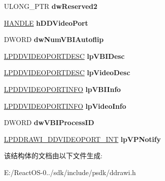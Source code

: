 \begin{DoxyCompactItemize}
U\+L\+O\+N\+G\+\_\+\+P\+TR {\bfseries dw\+Reserved2}
\item 
\mbox{\label{struct___d_d_r_a_w_i___d_d_v_i_d_e_o_p_o_r_t___l_c_l_a5feaf96f97dd06205e008cdae0ab720b}} 
\hyperlink{interfacevoid}{H\+A\+N\+D\+LE} {\bfseries h\+D\+D\+Video\+Port}
\item 
\mbox{\label{struct___d_d_r_a_w_i___d_d_v_i_d_e_o_p_o_r_t___l_c_l_a57682165ddae367279bb06b49b812bce}} 
D\+W\+O\+RD {\bfseries dw\+Num\+V\+B\+I\+Autoflip}
\item 
\mbox{\label{struct___d_d_r_a_w_i___d_d_v_i_d_e_o_p_o_r_t___l_c_l_af19ca9c80f8f821ca6d2ecc637a6d7e0}} 
\hyperlink{struct___d_d_v_i_d_e_o_p_o_r_t_d_e_s_c}{L\+P\+D\+D\+V\+I\+D\+E\+O\+P\+O\+R\+T\+D\+E\+SC} {\bfseries lp\+V\+B\+I\+Desc}
\item 
\mbox{\label{struct___d_d_r_a_w_i___d_d_v_i_d_e_o_p_o_r_t___l_c_l_abada362d759f22ee3b929d5127ecadb2}} 
\hyperlink{struct___d_d_v_i_d_e_o_p_o_r_t_d_e_s_c}{L\+P\+D\+D\+V\+I\+D\+E\+O\+P\+O\+R\+T\+D\+E\+SC} {\bfseries lp\+Video\+Desc}
\item 
\mbox{\label{struct___d_d_r_a_w_i___d_d_v_i_d_e_o_p_o_r_t___l_c_l_a0dbc6569eb8f210605a1388db987a688}} 
\hyperlink{struct___d_d_v_i_d_e_o_p_o_r_t_i_n_f_o}{L\+P\+D\+D\+V\+I\+D\+E\+O\+P\+O\+R\+T\+I\+N\+FO} {\bfseries lp\+V\+B\+I\+Info}
\item 
\mbox{\label{struct___d_d_r_a_w_i___d_d_v_i_d_e_o_p_o_r_t___l_c_l_a90b9592b6ec2d582a695882e70633306}} 
\hyperlink{struct___d_d_v_i_d_e_o_p_o_r_t_i_n_f_o}{L\+P\+D\+D\+V\+I\+D\+E\+O\+P\+O\+R\+T\+I\+N\+FO} {\bfseries lp\+Video\+Info}
\item 
\mbox{\label{struct___d_d_r_a_w_i___d_d_v_i_d_e_o_p_o_r_t___l_c_l_a328da723110a302ecfabc97565748d8c}} 
D\+W\+O\+RD {\bfseries dw\+V\+B\+I\+Process\+ID}
\item 
\mbox{\label{struct___d_d_r_a_w_i___d_d_v_i_d_e_o_p_o_r_t___l_c_l_a6084a5923ffa483b4e6d46b173dcbd24}} 
\hyperlink{struct___d_d_r_a_w_i___d_d_v_i_d_e_o_p_o_r_t___i_n_t}{L\+P\+D\+D\+R\+A\+W\+I\+\_\+\+D\+D\+V\+I\+D\+E\+O\+P\+O\+R\+T\+\_\+\+I\+NT} {\bfseries lp\+V\+P\+Notify}
\end{DoxyCompactItemize}


该结构体的文档由以下文件生成\+:\begin{DoxyCompactItemize}
\item 
E\+:/\+React\+O\+S-\/0../sdk/include/psdk/ddrawi.\+h\end{DoxyCompactItemize}
